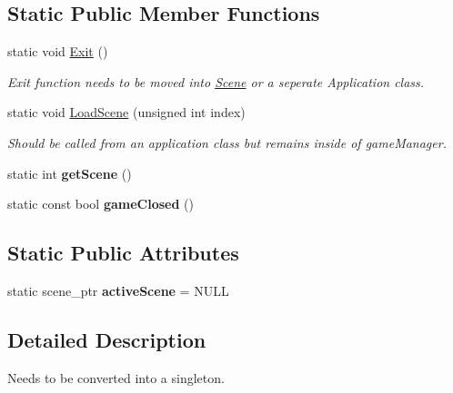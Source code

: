 \subsection*{Static Public Member Functions}
\begin{DoxyCompactItemize}
\item 
\mbox{\label{class_game_manager_acbd9fb84f9e18c8cb585738d5c89a2b9}} 
static void \hyperlink{class_game_manager_acbd9fb84f9e18c8cb585738d5c89a2b9}{Exit} ()
\begin{DoxyCompactList}\small\item\em Exit function needs to be moved into \hyperlink{class_scene}{Scene} or a seperate Application class. \end{DoxyCompactList}\item 
\mbox{\label{class_game_manager_a09b8801bcfdd8d5cbc52e27895b84e3b}} 
static void \hyperlink{class_game_manager_a09b8801bcfdd8d5cbc52e27895b84e3b}{Load\+Scene} (unsigned int index)
\begin{DoxyCompactList}\small\item\em Should be called from an application class but remains inside of game\+Manager. \end{DoxyCompactList}\item 
\mbox{\label{class_game_manager_ac8de938e05092ef365c77ba7a3c2c0d7}} 
static int {\bfseries get\+Scene} ()
\item 
\mbox{\label{class_game_manager_a4eb94c6171bf3292eb57b291e2174289}} 
static const bool {\bfseries game\+Closed} ()
\end{DoxyCompactItemize}
\subsection*{Static Public Attributes}
\begin{DoxyCompactItemize}
\item 
\mbox{\label{class_game_manager_a969dd909c6b70310843d34e2490736b4}} 
static scene\+\_\+ptr {\bfseries active\+Scene} = N\+U\+LL
\end{DoxyCompactItemize}


\subsection{Detailed Description}
Needs to be converted into a singleton. 

